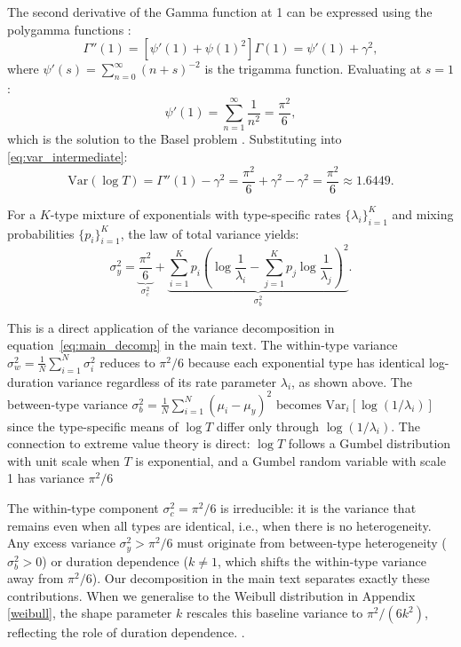 \documentclass[12pt]{article}
\theoremstyle{definition}
\theoremstyle{remark}
\begin{document}
\begin{appendices}
The second derivative of the Gamma function at 1 can be expressed using the polygamma functions \citep{abramowitz1965}:
\begin{equation}
    \Gamma''(1) = \left[\psi'(1) + \psi(1)^2\right] \Gamma(1) = \psi'(1) + \gamma^2,
\end{equation}
where $\psi'(s) = \sum_{n=0}^{\infty} (n+s)^{-2}$ is the trigamma function. Evaluating at $s = 1$:
\begin{equation}\label{eq:basel}
    \psi'(1) = \sum_{n=1}^{\infty} \frac{1}{n^2} = \frac{\pi^2}{6},
\end{equation}
which is the solution to the Basel problem \citep{euler1740}. Substituting into \eqref{eq:var_intermediate}:
\begin{equation}\label{eq:var_logT_final}
   \;\text{Var}(\log T) = \Gamma''(1) - \gamma^2 = \frac{\pi^2}{6} + \gamma^2 - \gamma^2 = \frac{\pi^2}{6} \approx 1.6449.\;
\end{equation}



For a $K$-type mixture of exponentials with type-specific rates $\{\lambda_i\}_{i=1}^K$ and mixing probabilities $\{p_i\}_{i=1}^K$, the law of total variance yields:
\begin{equation}\label{eq:decomp_exponential}
    \sigma^2_y = \underbrace{\frac{\pi^2}{6}}_{\sigma^2_c} + \underbrace{\sum_{i=1}^K p_i \left(\log\frac{1}{\lambda_i} - \sum_{j=1}^K p_j \log\frac{1}{\lambda_j}\right)^2}_{\sigma^2_b}.
\end{equation}

This is a direct application of the variance decomposition 
in equation~\eqref{eq:main_decomp} in the main text. The within-type variance 
$\sigma^2_w = \frac{1}{N}\sum_{i=1}^N \sigma^2_i$ reduces to 
$\pi^2/6$ because each exponential type has identical log-duration 
variance regardless of its rate parameter $\lambda_i$, as shown 
above. The between-type variance $\sigma^2_b = \frac{1}{N}\sum_{i=1}^N 
(\mu_i - \mu_y)^2$ becomes $\text{Var}_i[\log(1/\lambda_i)]$ 
since the type-specific means of $\log T$ differ only through 
$\log(1/\lambda_i)$. The connection to extreme value theory is direct: $\log T$ follows a Gumbel distribution with unit scale when $T$ is exponential, and a Gumbel random variable with scale 1 has variance $\pi^2/6$ 

The within-type component $\sigma^2_c = \pi^2/6$ is irreducible: it is the variance that remains even when all types are identical, i.e., when there is no heterogeneity. Any excess variance $\sigma^2_y > \pi^2/6$ must originate from between-type heterogeneity ($\sigma^2_b > 0$) or duration dependence ($k \neq 1$, which shifts the within-type variance away from $\pi^2/6$). Our decomposition in the main text separates exactly these contributions.
When we generalise to the Weibull distribution in Appendix \ref{weibull}, the shape parameter $k$ rescales this baseline variance to $\pi^2/(6k^2)$, reflecting the role of duration dependence. 
\citep{embrechts1997}. 






\end{appendices}
\end{document}
